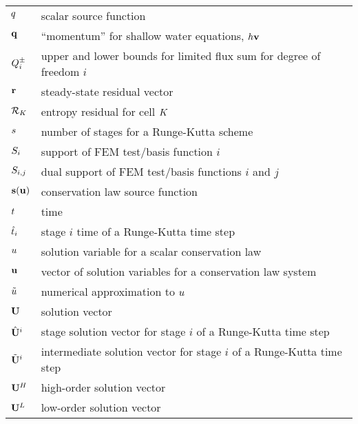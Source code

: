 \begin{center}
\begin{longtable}{l p{4.8in}}
$q$    & scalar source function\\
$\mathbf{q}$  & ``momentum'' for shallow water equations,
                     $h\mathbf{v}$\\
$Q^\pm_i$ & upper and lower bounds for limited flux sum for degree
                        of freedom $i$\\
$\mathbf{r}$           & steady-state residual vector\\
$\mathcal{R}_K$ & entropy residual for cell $K$\\
$s$       & number of stages for a Runge-Kutta scheme\\
$S_i$       & support of FEM test/basis function $i$\\
$S_{i,j}$      & dual support of FEM test/basis functions $i$ and $j$\\
$\mathbf{s}(\mathbf{u})$ & conservation law source function\\
$t$       & time\\

$\hat{t}_i$   & stage $i$ time of a Runge-Kutta time step\\
$u$  & solution variable for a scalar conservation law\\
$\mathbf{u}$  & vector of solution variables for a conservation law
                     system\\
$\tilde{u}$ & numerical approximation to $u$\\
$\mathbf{U}$  & solution vector\\
$\hat{\mathbf{U}}^i$ & stage solution vector for stage $i$ of a Runge-Kutta time
                       step\\
$\tilde{\mathbf{U}}^i$ & intermediate solution vector for stage $i$ of a
                              Runge-Kutta time step\\
$\highordersolution$ & high-order solution vector\\
$\lowordersolution$ & low-order solution vector\\


\end{longtable}
\end{center}
